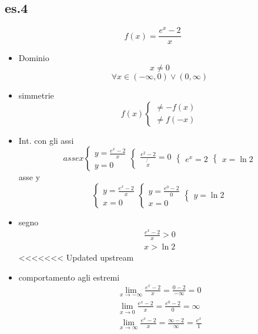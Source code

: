 \documentclass{article}
\begin{document}
	\subsection{es.4}
	\begin{equation*}
		f(x)=\frac{e^x-2}{x}
	\end{equation*}
	\begin{itemize}
		\item Dominio
		\begin{equation*}
			x\neq 0
		\end{equation*}
		\begin{equation*}
				\forall x \in (-\infty, 0) \vee (0,\infty)
		\end{equation*}
		\item simmetrie 
			\begin{equation*}
				f(x)\begin{cases}
					\neq -f(x)\\
					\neq f(-x)
				\end{cases}
			\end{equation*}
		\item Int. con gli assi
			\begin{equation*}
				asse x\begin{cases}
					y=\frac{e^x-2}{x}\\
					y=0
				\end{cases}\begin{cases}
					\frac{e^2-2}{\not{x}}=0
				\end{cases}\begin{cases}
					e^x=2
				\end{cases}\begin{cases}
					x=\ln 2
				\end{cases}
			\end{equation*}
			asse y\begin{equation*}
				\begin{cases}
					y=\frac{e^x-2}{x}\\
					x=0
				\end{cases}\begin{cases}
					y=\frac{e^0-2}{0}\\
					x=0
				\end{cases}\begin{cases}
					y=\ln2
				\end{cases}
			\end{equation*}
		\item segno
			\begin{equation*}
				\begin{matrix}
					\frac{e^x-2}{x}>0\\
					x>\ln 2
				\end{matrix}
			\end{equation*}
<<<<<<< Updated upstream
		\item comportamento agli estremi
		\begin{eqnarray}
			\lim_{x\to -\infty}\frac{e^x-2}{x}=\frac{0-2}{-\infty}=0\\
			\lim_{x\to 0}\frac{e^x-2}{x}=\frac{e^0-2}{0}=\infty\\
			\lim_{x\to \infty}\frac{e^x-2}{x}=\frac{\infty-2}{\infty}=\frac{e^x}{1}
		\end{eqnarray}
	\end{itemize}
\end{document}
